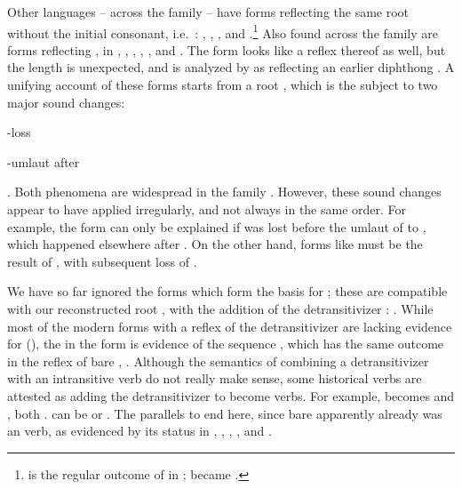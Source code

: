 Other languages -- across the family -- have forms reflecting the same root without the initial consonant, i.e.\ : \kalina, \panare, \yawarana, and \uxc.\footnote{ is the regular outcome of  in \uxc;  became  \parencite[176]{meira2005southern}.}
Also found across the family are forms reflecting , in \kaxui, \arara, \trio, \carijo, \maqui, and \mapoyo.
The \akuriyo form  looks like a reflex thereof as well, but the length is unexpected, and is analyzed by \textcite[]{meira1998proto} as reflecting an earlier diphthong .
A unifying account of these forms starts from a root , which is the subject to two major sound changes: \begin{inlinelist}
 \item {}-loss
 \item {}-umlaut after 
 \end{inlinelist}.
Both phenomena are widespread in the family \parencite{meira2010origin}.
However, these sound changes appear to have applied irregularly, and not always in the same order.
For example, the \kalina form  can only be explained if  was lost before the umlaut of  to , which happened elsewhere after .
On the other hand, forms like \maqui {} must be the result of , with subsequent loss of .

We have so far ignored the forms which form the basis for  ; these are compatible with our reconstructed root , with the addition of the detransitivizer : .
While most of the modern forms with a reflex of the detransitivizer are lacking evidence for  (), the  in the \akawaio form  is evidence of the sequence , which has the same outcome  in the \macushi reflex of bare , .
Although the semantics of combining a detransitivizer with an intransitive verb do not really make sense, some historical  verbs are attested as adding the detransitivizer to become  verbs.
For example,    becomes \trio {} \parencite[252]{triomeira1999} and \kalina {} \parencite[429]{courtz2008carib}, both .
\waiwai {} can be  \parencite[30]{waiwaihawkins1998} or  \parencite[204]{hawkins1953waiwai}.
The parallels to  end here, since bare   apparently already was an  verb, as evidenced by its status in \kaxui, \kalina, \panare {}, \arara, and \trio.

